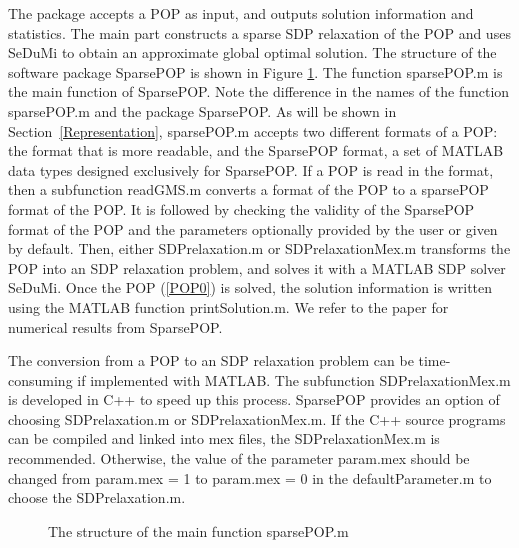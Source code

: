 The package accepts a POP as input, and outputs 
solution information and statistics. The main part 
constructs a sparse SDP relaxation  of  the POP  and uses
SeDuMi \cite{STRUM99} to obtain an approximate global optimal solution.
The structure of the software package SparsePOP is shown in Figure \ref{structure}. 
The function sparsePOP.m is the main function of SparsePOP. 
Note the difference in the names of the function sparsePOP.m and 
the package SparsePOP.
As %
will be shown in Section~\ref{Representation},
sparsePOP.m accepts two different formats of a POP:
the \GMS format \cite{GAMS} that is more readable,
and  the SparsePOP format, a set of 
MATLAB data types designed exclusively for SparsePOP. If a POP is read in the \GMS format, 
then a subfunction readGMS.m %
 converts a \GMS format of the POP 
to a sparsePOP format of the POP.  It is followed by checking the validity  of 
the SparsePOP format of the POP and the parameters optionally 
provided by the user or given by default.  Then, either SDPrelaxation.m or SDPrelaxationMex.m 
transforms the POP into an SDP relaxation problem, and solves it with a MATLAB SDP solver 
SeDuMi. Once the POP (\ref{POP0}) is solved, 
the solution information is written using the MATLAB function printSolution.m. We refer to the paper 
\cite{WAKI04} for numerical results from SparsePOP. 

The conversion from a POP to an SDP relaxation problem can be time-consuming if implemented
with MATLAB. The subfunction SDPrelaxationMex.m is developed in C++ to speed up this process.
SparsePOP provides an option of choosing SDPrelaxation.m or SDPrelaxationMex.m.
If   the C++ source programs can be compiled and linked
into mex files,  the SDPrelaxationMex.m is recommended.  Otherwise, %
the value of the parameter {\sf param.mex} should be changed
from {\sf param.mex = 1} to {\sf param.mex = 0} in the defaultParameter.m to choose the 
SDPrelaxation.m.
 
\begin{figure}
\label{structure}
\begin{center}
\caption{The structure of the main function sparsePOP.m}
\end{center}
\end{figure}
 
